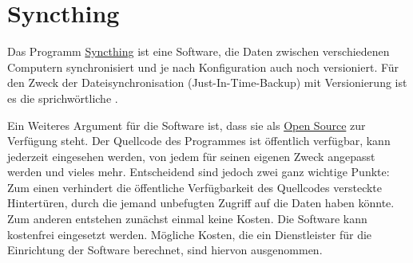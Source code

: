 

\section{Syncthing}

Das Programm \href{https://syncthing.net/}{Syncthing} ist eine Software, die
Daten zwischen verschiedenen Computern synchronisiert und je nach Konfiguration
auch noch versioniert. Für den Zweck der Dateisynchronisation
(Just-In-Time-Backup) mit Versionierung ist es die sprichwörtliche
.
\bigskip

Ein Weiteres Argument für die Software ist, dass sie als
\href{https://de.wikipedia.org/wiki/Open_Source}{Open Source}
zur Verfügung steht. Der Quellcode des Programmes ist öffentlich verfügbar,
kann jederzeit eingesehen werden, von jedem für seinen eigenen Zweck angepasst
werden und vieles mehr. Entscheidend sind jedoch zwei ganz wichtige Punkte:
Zum einen verhindert die öffentliche Verfügbarkeit des Quellcodes versteckte
Hintertüren, durch die jemand unbefugten Zugriff auf die Daten haben könnte.
Zum anderen entstehen zunächst einmal keine Kosten. Die Software kann kostenfrei
eingesetzt werden. Mögliche Kosten, die ein Dienstleister für die Einrichtung
der Software berechnet, sind hiervon ausgenommen.
\bigskip

